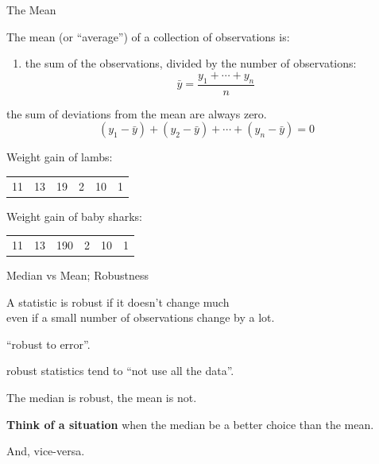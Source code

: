 \begin{frame}{The Mean}

    The \alert{mean} (or ``average'') of a collection of observations is:
    \begin{enumerate}
        \item the sum of the observations, divided by the number of observations:
            \[
                \bar y = \frac{ y_1 + \cdots + y_n }{ n  }
            \]
    \end{enumerate}

    \pause

     the sum of deviations from the mean are always zero.
    \[
        (y_1 - \bar y) + (y_2 - \bar y) + \cdots + (y_n - \bar y) = 0
    \]

    \pause
    \vspace{2em}

     Weight gain of lambs:
    \begin{center}
        \begin{tabular}{cccccc}
            11 & 13 & 19 & 2 & 10 & 1
        \end{tabular}
    \end{center}

    \pause
    \vspace{2em}

     Weight gain of baby sharks:
    \begin{center}
        \begin{tabular}{cccccc}
            11 & 13 & 190 & 2 & 10 & 1
        \end{tabular}
    \end{center}

\end{frame}


\begin{frame}{Median vs Mean; Robustness}

    A statistic is \alert{robust} if it doesn't change much\\
    even if a small number of observations change by a lot. \\

    \vspace{3em}

     ``robust to error''.

    \vspace{3em}

     robust statistics tend to ``not use all the data''.

    \vspace{3em}
    \pause

    The median is robust, the mean is not.

    \vspace{2em}

    \textbf{Think of a situation} when the median be a better choice than the mean.

    And, vice-versa.

\end{frame}


